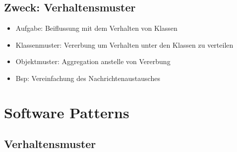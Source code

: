 \documentclass[11pt, fleqn, a4paper, leqno]{scrartcl} %
\begin{document}
		\subsection{Zweck: Verhaltensmuster}
			\begin{itemize}
				\item Aufgabe: Beiflussung mit dem Verhalten von Klassen
				\item Klassenmuster: Vererbung um Verhalten unter den Klassen zu verteilen
				\item Objektmuster: Aggregation anstelle von Vererbung
				\item Bsp: Vereinfachung des Nachrichtenaustausches
			\end{itemize}
	\newpage
	\section{Software Patterns}
		\subsection{Verhaltensmuster}
\end{document}
